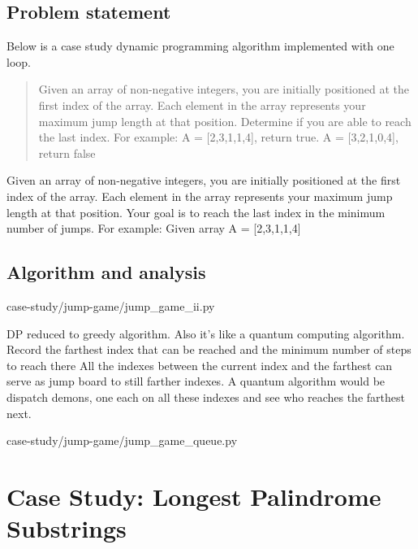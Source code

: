\documentclass[oneside,11pt]{book}
\theoremstyle{definition}
\theoremstyle{remark}
\begin{document}
\section{Problem statement}\label{sec:problemStatement}

Below is a case study dynamic programming algorithm implemented with one loop.
\begin{quote}
    Given an array of non-negative integers, you are initially positioned at the first index of the array.
    Each element in the array represents your maximum jump length at that position.
    Determine if you are able to reach the last index.
    For example:
    A = [2,3,1,1,4], return true.
    A = [3,2,1,0,4], return false
\end{quote}



Given an array of non-negative integers, you are initially positioned at the first index of
the array.
Each element in the array represents your maximum jump length at that position.
Your goal is to reach the last index in the minimum number of jumps.
For example:
Given array A = [2,3,1,1,4]
\section{Algorithm and analysis}

\begin{clisting}
    
    {case-study/jump-game/jump_game_ii.py}
\end{clisting}

DP reduced to greedy algorithm.
Also it's like a quantum computing algorithm.
Record the farthest index that can be reached and the minimum number of steps to reach there
All the indexes between the current index and the farthest can serve as jump board to
still farther indexes.
A quantum algorithm would be dispatch demons, one each on all these indexes and see who
reaches the farthest next.

\begin{clisting}
    
    {case-study/jump-game/jump_game_queue.py}
\end{clisting}
\clearpage{}
    \clearpage{}

\chapter{Case Study: Longest Palindrome Substrings}\label{ch:longestPalindromeSubstrings}
\end{document}
